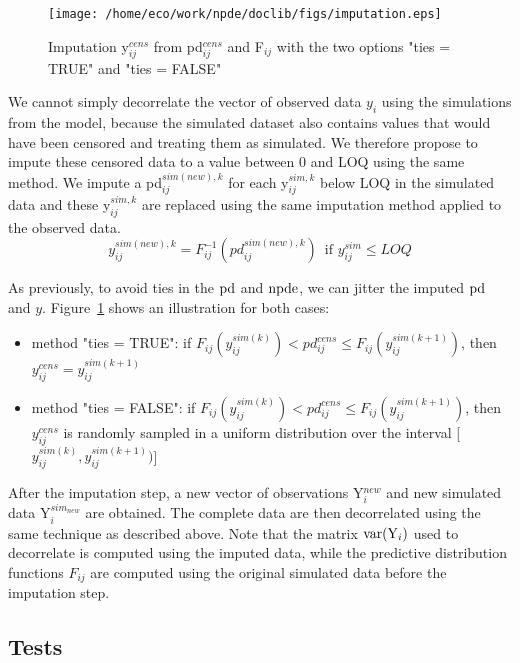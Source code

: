 \begin{figure}[!h]
\texttt{[image: /home/eco/work/npde/doclib/figs/imputation.eps]}
\caption{Imputation y$_{ij}^{cens}$ from pd$_{ij}^{cens}$ and F$_{ij}$ with the two options {\sf "ties = TRUE"} and {\sf "ties = FALSE"}}
\label{fig:imputation}
\end{figure}

We cannot simply decorrelate the vector of observed data $y_{i}$ using the simulations from the model, because the simulated dataset also contains values that would have been censored and treating them as simulated. We therefore propose to impute these censored data to a value between 0 and LOQ using the same method. We impute a pd$_{ij}^{sim(new),k}$ for each y$_{ij}^{sim,k}$ below LOQ in the simulated data and these y$_{ij}^{sim,k}$ are replaced using the same imputation method applied to the observed data. 
\begin{equation}
y_{ij}^{sim(new),k}=F_{ij}^{-1}(pd_{ij}^{sim(new),k})\,\,\,\mbox{if }y_{ij}^{sim}\leq LOQ
\end{equation}

\bigskip
As previously, to avoid ties in the ${\rm pd}$ and ${\rm npde}$, we can jitter the imputed ${\rm pd}$ and $y$. Figure~\ref{fig:imputation} shows an illustration for both cases:
\begin{itemize}
\item method {\sf "ties = TRUE"}: if $F_{ij}(y_{ij}^{sim(k)}) < pd_{ij}^{cens}\leq F_{ij}(y_{ij}^{sim(k+1)})$, then $y_{ij}^{cens} = y_{ij}^{sim(k+1)}$
\item method {\sf "ties = FALSE"}: if $F_{ij}(y_{ij}^{sim(k)}) < pd_{ij}^{cens}\leq F_{ij}(y_{ij}^{sim(k+1)})$, then $y_{ij}^{cens}$ is randomly sampled in a uniform distribution over the interval [$y_{ij}^{sim(k)},y_{ij}^{sim(k+1)})$]
\end{itemize}

After the imputation step, a new vector of observations Y$_{i}^{new}$ and new simulated data Y$_{i}^{sim_{new}}$ are obtained. The complete data are then decorrelated using the same technique as described above. Note that the matrix $\hbox{var}({\rm Y}_i)$ used to decorrelate is computed using the imputed data, while the predictive distribution functions $F_{ij}$ are computed using the original simulated data before the imputation step.

\subsection{Tests}

